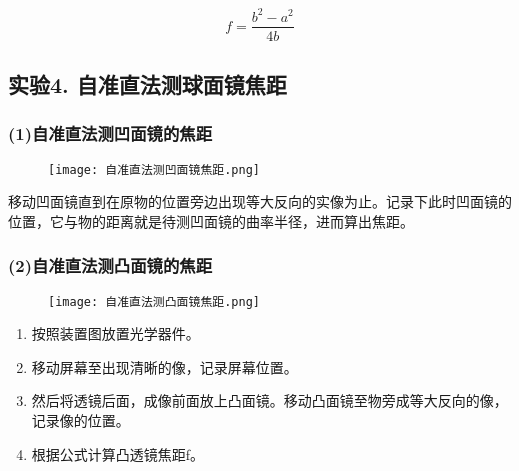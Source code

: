 \documentclass[11pt,a4paper,oneside]{article}
\begin{document}
$$f = \displaystyle\frac{b^2-a^2}{4b}$$

\subsection*{实验4. 自准直法测球面镜焦距}

\subsubsection*{(1)自准直法测凹面镜的焦距}
\begin{figure}[H]
 \centering
  \texttt{[image: 自准直法测凹面镜焦距.png]}
\end{figure}
移动凹面镜直到在原物的位置旁边出现等大反向的实像为止。记录下此时凹面镜的位置，它与物的距离就是待测凹面镜的曲率半径，进而算出焦距。

\subsubsection*{(2)自准直法测凸面镜的焦距}
\begin{figure}[H]
 \centering
  \texttt{[image: 自准直法测凸面镜焦距.png]}
\end{figure}
\begin{enumerate}
\item 按照装置图放置光学器件。
\item 移动屏幕至出现清晰的像，记录屏幕位置。
\item 然后将透镜后面，成像前面放上凸面镜。移动凸面镜至物旁成等大反向的像，记录像的位置。
\item 根据公式计算凸透镜焦距f。
\end{enumerate}
\end{document}
